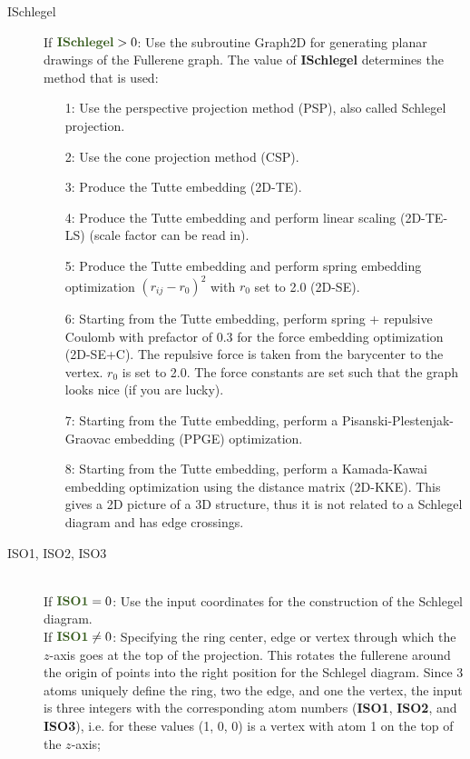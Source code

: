\documentclass[article,a4paper,twoside]{memoir}
\newcommand{\paramname}[1]{{\color{green}\textbf{#1}}}
\begin{document}
\begin{description}
\item[ISchlegel] 
If $\paramname{ISchlegel} > 0$: Use the subroutine Graph2D for generating planar drawings of the Fullerene graph.
The value of \paramname{ISchlegel} determines the method that is used:
\begin{enumerate}
\item[1:] Use the perspective projection method (PSP), also called Schlegel projection.
\item[2:] Use the cone projection method (CSP).
\item[3:] Produce the Tutte embedding (2D-TE).
\item[4:] Produce the Tutte embedding and perform linear scaling (2D-TE-LS) (scale factor can be read in).
\item[5:] Produce the Tutte embedding and perform spring embedding optimization $(r_{ij}-r_0)^2$ with $r_0$ set to 2.0 (2D-SE).
\item[6:] Starting from the Tutte embedding, perform spring + repulsive Coulomb with prefactor of 0.3 for the
  force embedding optimization (2D-SE+C). The repulsive force is taken from the barycenter to the vertex. $r_0$ is set to 2.0. The force
  constants are set such that the graph looks nice (if you are lucky).
\item[7:] Starting from the Tutte embedding, perform a Pisanski-Plestenjak-Graovac embedding (PPGE) optimization.
\item[8:] Starting from the Tutte embedding, perform a Kamada-Kawai embedding \cite{kamada89}
optimization using the distance matrix (2D-KKE).  This gives a 2D picture of a 3D structure, thus
it is not related to a Schlegel diagram and has edge crossings.
\end{enumerate}
\item[ISO1, ISO2, ISO3]\ \\
  If $\paramname{ISO1} = 0$: Use the input coordinates for the construction of the Schlegel diagram.\\
  If $\paramname{ISO1} \ne 0$: Specifying the ring center, edge or vertex through which the $z$-axis goes at the top of the projection. This rotates
  the fullerene around the origin of points into the right position for the Schlegel diagram. Since 3 atoms
  uniquely define the ring, two the edge, and one the vertex, the input is three integers with the corresponding
  atom numbers  (\paramname{ISO1}, \paramname{ISO2}, and \paramname{ISO3}), i.e. for these values (1, 0, 0) is a vertex with atom 1 on the top of the $z$-axis;

\end{description}
\end{document}
